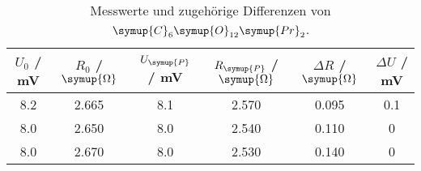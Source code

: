 \begin{table}[!htp]
\centering
\caption{Messwerte und zugehörige Differenzen von $\symup{C}_6\symup{O}_{12}\symup{Pr}_2$.}
\label{tab:C6O12Pr2}
\begin{tabular}{c c c c c c}
\toprule
{$U_0$ / mV} & {$R_0$ / $\symup{\Omega}$} & {$U_{\symup{P}}$ / mV} & {$R_{\symup{P}}$ / $\symup{\Omega}$}  & {$\Delta R$ / $\symup{\Omega}$} & {$\Delta U$ / mV}\\
\midrule
8.2 & 2.665 & 8.1 & 2.570 & 0.095 & 0.1 \\
8.0 & 2.650 & 8.0 & 2.540 & 0.110 & 0 \\
8.0 & 2.670 & 8.0 & 2.530 & 0.140 & 0 \\
\bottomrule
\end{tabular}
\end{table}